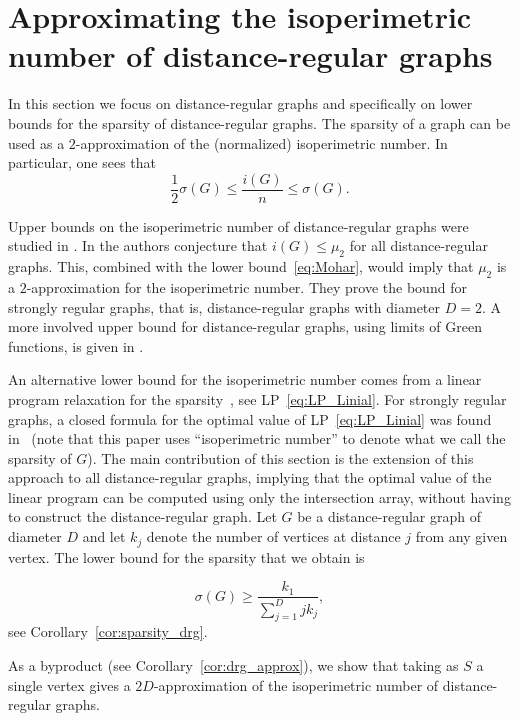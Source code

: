 \documentclass[a4paper,11pt]{article}
\theoremstyle{definition}
\begin{document}
\section{Approximating the isoperimetric number of distance-regular graphs}\label{sec:DRG}
In this section we focus on distance-regular graphs and specifically on lower bounds for the sparsity of distance-regular graphs. The sparsity of a graph can be used as a $2$-approximation of the (normalized) isoperimetric number. In particular, one sees that 
\begin{equation}\label{eq:sparsityisoperimetric}
    \frac{1}{2} \sigma(G) \leq \frac{i(G)}{n} \leq \sigma(G). 
\end{equation}


Upper bounds on the isoperimetric number of distance-regular graphs were studied in \cite{KL2013, QKM2020}. In \cite{QKM2020} the authors conjecture that $i(G) \le \mu_2$ for all distance-regular graphs. This, combined with the lower bound~\eqref{eq:Mohar}, would imply that $\mu_2$ is a $2$-approximation for the isoperimetric number. They prove the bound for strongly regular graphs, that is, distance-regular graphs with diameter $D = 2$. A more involved upper bound for distance-regular graphs, using limits of Green functions, is given in \cite{KL2013}. 

An alternative lower bound for the isoperimetric number comes from a linear program relaxation for the sparsity~\cite{LLR1995}, see LP~\eqref{eq:LP_Linial}. For strongly regular graphs, a closed formula for the optimal value of LP~\eqref{eq:LP_Linial} was found in~\cite{S2005} (note that this paper uses ``isoperimetric number'' to denote what we call the sparsity of $G$). The main contribution of this section is the extension of this approach to all distance-regular graphs, implying that the optimal value of the linear program can be computed using only the intersection array, without having to construct the distance-regular graph. Let $G$ be a distance-regular graph of diameter $D$ and let $k_j$ denote the number of vertices at distance $j$ from any given vertex. The lower bound for the sparsity that we obtain is


\begin{equation}\label{eq:sparsity drg}
\sigma(G) \geq \frac{k_1}{\sum_{j=1}^D jk_j},
\end{equation}
see Corollary~\ref{cor:sparsity_drg}.


As a byproduct (see Corollary~\ref{cor:drg_approx}), we show that taking as $S$ a single vertex gives a $2D$-approximation of the isoperimetric  number of distance-regular graphs.
\end{document}
